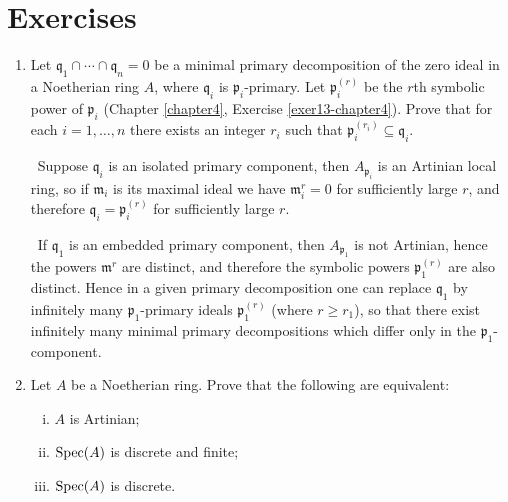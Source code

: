 \section*{Exercises}

\begin{enumerate}
    \item \label{exer1-chapter8}Let $\mathfrak{q}_1 \cap \cdots \cap \mathfrak{q}_n = 0$ be a minimal primary decomposition of the zero ideal in a Noetherian ring $A$, where $\mathfrak{q}_i$ is $\mathfrak{p}_i$-primary. Let $\mathfrak{p}_i^{(r)}$ be the $r$th symbolic power of $\mathfrak{p}_i$ (Chapter \ref{chapter4}, Exercise \ref{exer13-chapter4}). Prove that for each $i = 1, \ldots, n$ there exists an integer $r_i$ such that $\mathfrak{p}_i^{(r_i)} \subseteq \mathfrak{q}_i$.
    
    \quad\, Suppose $\mathfrak{q}_i$ is an isolated primary component, then $A_{\mathfrak{p}_i}$ is an Artinian local ring, so if $\mathfrak{m}_i$ is its maximal ideal we have $\mathfrak{m}_i^r = 0$ for sufficiently large $r$, and therefore $\mathfrak{q}_i = \mathfrak{p}_i^{(r)}$ for sufficiently large $r$.

    \quad\, If $\mathfrak{q}_1$ is an embedded primary component, then $A_{\mathfrak{p}_1}$ is not Artinian, hence the powers $\mathfrak{m}^r$ are distinct, and therefore the symbolic powers $\mathfrak{p}_1^{(r)}$ are also distinct. Hence in a given primary decomposition one can replace $\mathfrak{q}_1$ by infinitely many $\mathfrak{p}_1$-primary ideals $\mathfrak{p}_1^{(r)}$ (where $r \geq r_1$), so that there exist infinitely many minimal primary decompositions which differ only in the $\mathfrak{p}_1$-component.

    \item \label{exer2-chapter8}Let $A$ be a Noetherian ring. Prove that the following are equivalent:
    \begin{enumerate}[i)]
        \item $A$ is Artinian;
        \item $\operatorname{Spec}(A)$ is discrete and finite;
        \item $\operatorname{Spec}(A)$ is discrete.
    \end{enumerate}


\end{enumerate}
